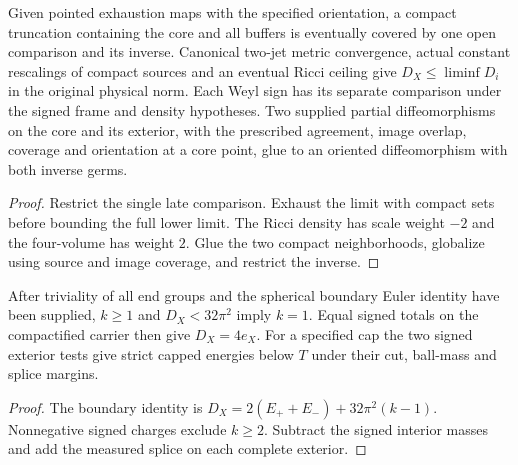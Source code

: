 \begin{proposition}
\label{prop:ed47-mark}
\leanok
Given pointed exhaustion maps with the specified orientation, a compact
truncation containing the core and all buffers is eventually covered by
one open comparison and its inverse. Canonical two-jet metric convergence,
actual constant rescalings of compact sources and an eventual Ricci ceiling
give $D_X\le\liminf D_i$ in the original physical norm. Each Weyl sign
has its separate comparison under the signed frame and density hypotheses.
Two supplied partial diffeomorphisms on the core and its exterior, with
the prescribed agreement, image overlap, coverage and orientation at a
core point, glue to an oriented diffeomorphism with both inverse germs.
\end{proposition}
\begin{proof}
\leanok
Restrict the single late comparison. Exhaust the limit with compact sets
before bounding the full lower limit. The Ricci density has scale weight
$-2$ and the four-volume has weight $2$. Glue the two compact neighborhoods,
globalize using source and image coverage, and restrict the inverse.
\end{proof}

\begin{proposition}
\label{prop:ed47-ends}
\leanok
After triviality of all end groups and the spherical boundary Euler
identity have been supplied, $k\ge1$ and $D_X<32\pi^2$ imply $k=1$.
Equal signed totals on the compactified carrier then give $D_X=4e_X$.
For a specified cap the two signed exterior tests give strict capped
energies below $T$ under their cut, ball-mass and splice margins.
\end{proposition}
\begin{proof}
\leanok
The boundary identity is $D_X=2(E_++E_-)+32\pi^2(k-1)$. Nonnegative
signed charges exclude $k\ge2$. Subtract the signed interior masses and
add the measured splice on each complete exterior.
\end{proof}

